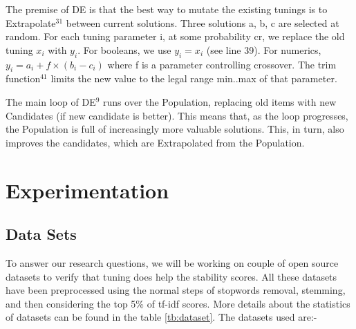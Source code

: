\documentclass[10pt,conference]{IEEEtran}
\theoremstyle{break}
\begin{document}
The premise of DE is that the best way to mutate the existing tunings is to
Extrapolate$^{31}$ between current solutions. Three solutions a, b, c are
selected at random. For each tuning parameter i, at some probability cr, we
replace the old tuning $x_i$ with $y_i$. For booleans, we use $y_i = x_i$ (see
line 39). For numerics, $y_i = a_i + f \times (b_i - c_i)$ where f is a
parameter controlling crossover. The trim function$^{41}$ limits the new value
to the legal range min..max of that parameter.

The main loop of DE$^{9}$ runs over the Population, replacing old items with new Candidates (if new candidate is better). This means that, as the loop progresses, the Population is full of increasingly more valuable solutions. This, in turn, also improves the candidates, which are Extrapolated from the Population.

\section{Experimentation}

\subsection{Data Sets}
To answer our research questions, we will be working on couple of open source datasets to verify that tuning does help the stability scores. All these datasets have been preprocessed using the normal steps of stopwords removal, stemming, and then considering the top 5\% of tf-idf scores. More details about the statistics of datasets can be found in the table \ref{tb:dataset}. The datasets used are:-
\end{document}
